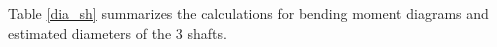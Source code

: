 Table \ref{dia_sh} summarizes the calculations for bending moment diagrams and estimated diameters of the 3 shafts.

\clearpage
